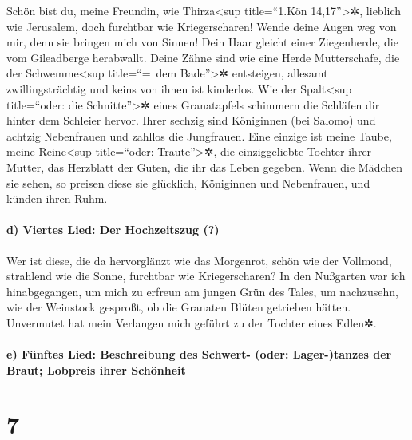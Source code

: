 Schön bist du, meine Freundin, wie Thirza\textless sup
title=``1.Kön 14,17''\textgreater✲, lieblich wie Jerusalem, doch
furchtbar wie Kriegerscharen! Wende deine Augen weg von
mir, denn sie bringen mich von Sinnen! Dein Haar gleicht einer
Ziegenherde, die vom Gileadberge herabwallt. Deine Zähne
sind wie eine Herde Mutterschafe, die der Schwemme\textless sup
title=``=~dem Bade''\textgreater✲ entsteigen, allesamt zwillingsträchtig
und keins von ihnen ist kinderlos. Wie der
Spalt\textless sup title=``oder: die Schnitte''\textgreater✲ eines
Granatapfels schimmern die Schläfen dir hinter dem Schleier hervor.
Ihrer sechzig sind Königinnen (bei Salomo) und achtzig
Nebenfrauen und zahllos die Jungfrauen. Eine einzige ist
meine Taube, meine Reine\textless sup title=``oder:
Traute''\textgreater✲, die einziggeliebte Tochter ihrer Mutter, das
Herzblatt der Guten, die ihr das Leben gegeben. Wenn die Mädchen sie
sehen, so preisen diese sie glücklich, Königinnen und Nebenfrauen, und
künden ihren Ruhm.

\hypertarget{d-viertes-lied-der-hochzeitszug}{%
\paragraph{d) Viertes Lied: Der Hochzeitszug
(?)}\label{d-viertes-lied-der-hochzeitszug}}

Wer ist diese, die da hervorglänzt wie das Morgenrot,
schön wie der Vollmond, strahlend wie die Sonne, furchtbar wie
Kriegerscharen? In den Nußgarten war ich hinabgegangen,
um mich zu erfreun am jungen Grün des Tales, um nachzusehn, wie der
Weinstock gesproßt, ob die Granaten Blüten getrieben hätten.
Unvermutet hat mein Verlangen mich geführt zu der Tochter
eines Edlen✲.

\hypertarget{e-fuxfcnftes-lied-beschreibung-des-schwert--oder-lager-tanzes-der-braut-lobpreis-ihrer-schuxf6nheit}{%
\paragraph{e) Fünftes Lied: Beschreibung des Schwert- (oder:
Lager-)tanzes der Braut; Lobpreis ihrer
Schönheit}\label{e-fuxfcnftes-lied-beschreibung-des-schwert--oder-lager-tanzes-der-braut-lobpreis-ihrer-schuxf6nheit}}

\hypertarget{section-6}{%
\section{7}\label{section-6}}

